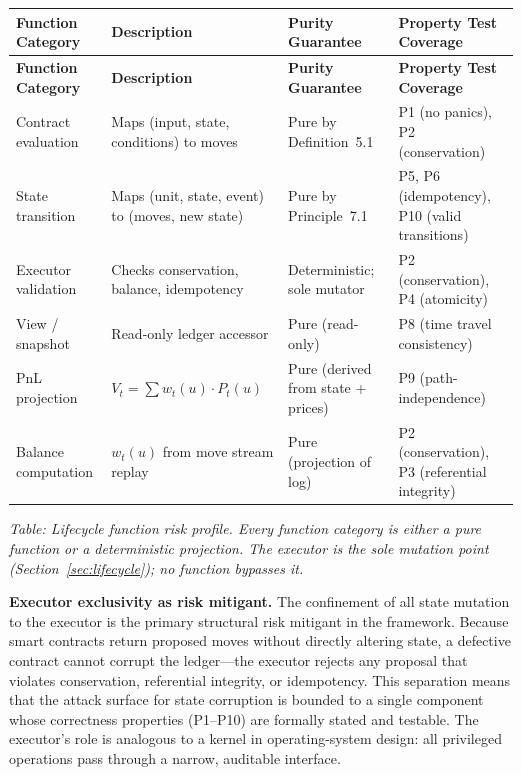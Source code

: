 \documentclass[11pt,a4paper]{article}
\begin{document}
\begin{center}
\begin{longtable}{p{3.2cm} p{4cm} p{2.8cm} p{3.5cm}}
\toprule
\textbf{Function Category} & \textbf{Description} & \textbf{Purity Guarantee} & \textbf{Property Test Coverage} \\
\midrule
\endfirsthead
\toprule
\textbf{Function Category} & \textbf{Description} & \textbf{Purity Guarantee} & \textbf{Property Test Coverage} \\
\midrule
\endhead
Contract evaluation & Maps (input, state, conditions) to moves & Pure by Definition~5.1 & P1 (no panics), P2 (conservation) \\
\midrule
State transition & Maps (unit, state, event) to (moves, new state) & Pure by Principle~7.1 & P5, P6 (idempotency), P10 (valid transitions) \\
\midrule
Executor validation & Checks conservation, balance, idempotency & Deterministic; sole mutator & P2 (conservation), P4 (atomicity) \\
\midrule
View / snapshot & Read-only ledger accessor & Pure (read-only) & P8 (time travel consistency) \\
\midrule
PnL projection & $V_t = \sum w_t(u) \cdot P_t(u)$ & Pure (derived from state + prices) & P9 (path-independence) \\
\midrule
Balance computation & $w_t(u)$ from move stream replay & Pure (projection of log) & P2 (conservation), P3 (referential integrity) \\
\bottomrule
\end{longtable}
\end{center}

\noindent\textit{Table: Lifecycle function risk profile. Every function category is either a pure function or a deterministic projection. The executor is the sole mutation point (Section~\ref{sec:lifecycle}); no function bypasses it.}

\medskip

\noindent\textbf{Executor exclusivity as risk mitigant.} The confinement of all state mutation to the executor is the primary structural risk mitigant in the framework. Because smart contracts return proposed moves without directly altering state, a defective contract cannot corrupt the ledger---the executor rejects any proposal that violates conservation, referential integrity, or idempotency. This separation means that the attack surface for state corruption is bounded to a single component whose correctness properties (P1--P10) are formally stated and testable. The executor's role is analogous to a kernel in operating-system design: all privileged operations pass through a narrow, auditable interface.
\end{document}
